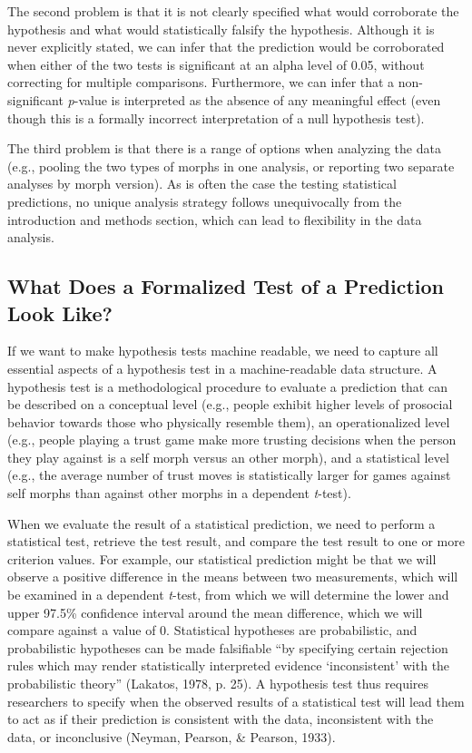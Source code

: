 \documentclass[
  english,
  doc,floatsintext]{apa6}
\begin{document}
The second problem is that it is not clearly specified what would corroborate the hypothesis and what would statistically falsify the hypothesis. Although it is never explicitly stated, we can infer that the prediction would be corroborated when either of the two tests is significant at an alpha level of 0.05, without correcting for multiple comparisons. Furthermore, we can infer that a non-significant \emph{p}-value is interpreted as the absence of any meaningful effect (even though this is a formally incorrect interpretation of a null hypothesis test).

The third problem is that there is a range of options when analyzing the data (e.g., pooling the two types of morphs in one analysis, or reporting two separate analyses by morph version). As is often the case the testing statistical predictions, no unique analysis strategy follows unequivocally from the introduction and methods section, which can lead to flexibility in the data analysis.

\hypertarget{what-does-a-formalized-test-of-a-prediction-look-like}{%
\subsection{What Does a Formalized Test of a Prediction Look Like?}\label{what-does-a-formalized-test-of-a-prediction-look-like}}

If we want to make hypothesis tests machine readable, we need to capture all essential aspects of a hypothesis test in a machine-readable data structure. A hypothesis test is a methodological procedure to evaluate a prediction that can be described on a conceptual level (e.g., people exhibit higher levels of prosocial behavior towards those who physically resemble them), an operationalized level (e.g., people playing a trust game make more trusting decisions when the person they play against is a self morph versus an other morph), and a statistical level (e.g., the average number of trust moves is statistically larger for games against self morphs than against other morphs in a dependent \emph{t}-test).

When we evaluate the result of a statistical prediction, we need to perform a statistical test, retrieve the test result, and compare the test result to one or more criterion values. For example, our statistical prediction might be that we will observe a positive difference in the means between two measurements, which will be examined in a dependent \emph{t}-test, from which we will determine the lower and upper 97.5\% confidence interval around the mean difference, which we will compare against a value of 0. Statistical hypotheses are probabilistic, and probabilistic hypotheses can be made falsifiable \enquote{by specifying certain rejection rules which may render statistically interpreted evidence \enquote{inconsistent} with the probabilistic theory} (Lakatos, 1978, p. 25). A hypothesis test thus requires researchers to specify when the observed results of a statistical test will lead them to act as if their prediction is consistent with the data, inconsistent with the data, or inconclusive (Neyman, Pearson, \& Pearson, 1933).
\end{document}
